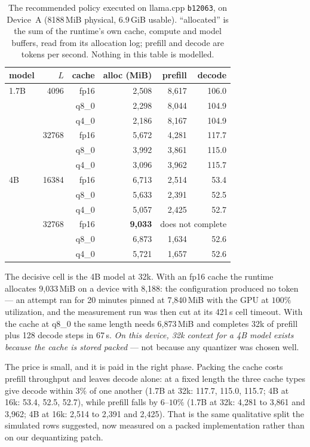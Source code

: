 \documentclass[10pt,journal]{IEEEtran}
\begin{document}
\begin{table}[t]
\caption{The recommended policy executed on llama.cpp \texttt{b12063}, on
Device~A (8188\,MiB physical, 6.9\,GiB usable). ``allocated'' is the sum of the
runtime's own cache, compute and model buffers, read from its allocation log;
prefill and decode are tokens per second. Nothing in this table is modelled.}
\label{tab:exec}
\begin{tabular}{@{}lrrrrr@{}}
\toprule
model & $L$ & cache & alloc (MiB) & prefill & decode \\
\midrule
1.7B & 4096  & fp16  & 2{,}508 & 8{,}617 & 106.0 \\
     &       & q8\_0 & 2{,}298 & 8{,}044 & 104.9 \\
     &       & q4\_0 & 2{,}186 & 8{,}167 & 104.9 \\
\addlinespace
     & 32768 & fp16  & 5{,}672 & 4{,}281 & 117.7 \\
     &       & q8\_0 & 3{,}992 & 3{,}861 & 115.0 \\
     &       & q4\_0 & 3{,}096 & 3{,}962 & 115.7 \\
\midrule
4B   & 16384 & fp16  & 6{,}713 & 2{,}514 & 53.4 \\
     &       & q8\_0 & 5{,}633 & 2{,}391 & 52.5 \\
     &       & q4\_0 & 5{,}057 & 2{,}425 & 52.7 \\
\addlinespace
     & 32768 & fp16  & \textbf{9{,}033} & \multicolumn{2}{c}{does not complete} \\
     &       & q8\_0 & 6{,}873 & 1{,}634 & 52.6 \\
     &       & q4\_0 & 5{,}721 & 1{,}657 & 52.6 \\
\bottomrule
\end{tabular}
\end{table}

The decisive cell is the 4B model at 32k. With an fp16 cache the runtime allocates
9{,}033\,MiB on a device with 8{,}188: the configuration produced no token --- an
attempt ran for 20 minutes pinned at 7{,}840\,MiB with the GPU at $100\%$
utilization, and the measurement run was then cut at its 421\,s cell timeout.
With the cache at q8\_0 the same length needs 6{,}873\,MiB and completes 32k of
prefill plus 128 decode steps in 67\,s. \emph{On this device, 32k context for a 4B
model exists because the cache is stored packed} --- not because any quantizer was
chosen well.

The price is small, and it is paid in the right phase. Packing the cache costs
prefill throughput and leaves decode alone: at a fixed length the three cache types
give decode within $3\%$ of one another (1.7B at 32k: 117.7, 115.0, 115.7; 4B at
16k: 53.4, 52.5, 52.7), while prefill falls by $6$--$10\%$ (1.7B at 32k: 4{,}281
to 3{,}861 and 3{,}962; 4B at 16k: 2{,}514 to 2{,}391 and 2{,}425). That is the
same qualitative split the simulated rows suggested, now measured on a packed
implementation rather than on our dequantizing patch.
\end{document}
